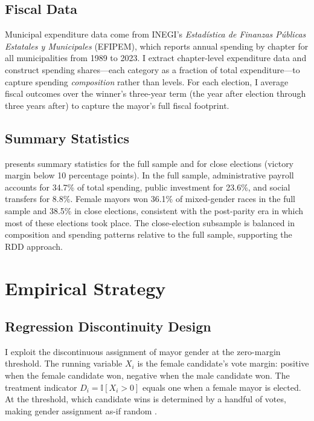 \documentclass[12pt]{article}
\newcommand{\ind}{\mathbb{I}}
\begin{document}
\subsection{Fiscal Data}

Municipal expenditure data come from INEGI's \textit{Estad\'{i}stica de Finanzas P\'{u}blicas Estatales y Municipales} (EFIPEM), which reports annual spending by chapter for all municipalities from 1989 to 2023. I extract chapter-level expenditure data and construct spending shares---each category as a fraction of total expenditure---to capture spending \textit{composition} rather than levels. For each election, I average fiscal outcomes over the winner's three-year term (the year after election through three years after) to capture the mayor's full fiscal footprint.

\subsection{Summary Statistics}



 presents summary statistics for the full sample and for close elections (victory margin below 10 percentage points). In the full sample, administrative payroll accounts for 34.7\% of total spending, public investment for 23.6\%, and social transfers for 8.8\%. Female mayors won 36.1\% of mixed-gender races in the full sample and 38.5\% in close elections, consistent with the post-parity era in which most of these elections took place. The close-election subsample is balanced in composition and spending patterns relative to the full sample, supporting the RDD approach.


\section{Empirical Strategy}

\subsection{Regression Discontinuity Design}

I exploit the discontinuous assignment of mayor gender at the zero-margin threshold. The running variable $X_i$ is the female candidate's vote margin: positive when the female candidate won, negative when the male candidate won. The treatment indicator $D_i = \ind[X_i > 0]$ equals one when a female mayor is elected. At the threshold, which candidate wins is determined by a handful of votes, making gender assignment as-if random \citep{leelemieux2010}.
\end{document}

